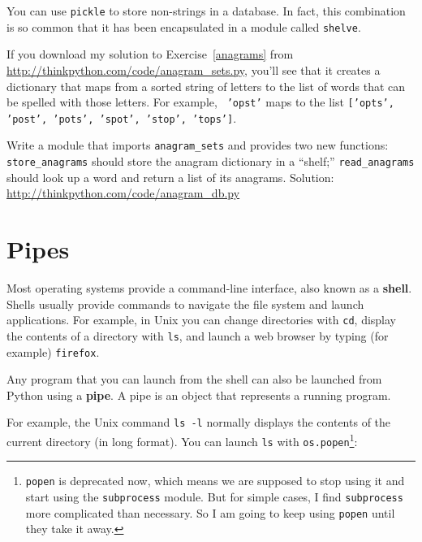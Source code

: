 \documentclass[10pt]{book}
\begin{document}
You can use {\tt pickle} to store non-strings in a database.
In fact, this combination is so common that it has been
encapsulated in a module called {\tt shelve}.  


\begin{exercise}

If you download my solution to Exercise~\ref{anagrams} from
\url{http://thinkpython.com/code/anagram_sets.py}, you'll see that it creates
a dictionary that maps from a sorted string of letters to the list of
words that can be spelled with those letters.  For example, {\tt
  'opst'} maps to the list {\tt ['opts', 'post', 'pots', 'spot',
    'stop', 'tops']}.

Write a module that imports \verb"anagram_sets" and provides
two new functions: \verb"store_anagrams" should store the
anagram dictionary in a ``shelf;'' \verb"read_anagrams" should
look up a word and return a list of its anagrams.
Solution: \url{http://thinkpython.com/code/anagram_db.py}

\end{exercise}


\section{Pipes}

Most operating systems provide a command-line interface,
also known as a {\bf shell}.  Shells usually provide commands
to navigate the file system and launch applications.  For
example, in Unix you can change directories with {\tt cd},
display the contents of a directory with {\tt ls}, and launch
a web browser by typing (for example) {\tt firefox}.

Any program that you can launch from the shell can also be
launched from Python using a {\bf pipe}.  A pipe is an object
that represents a running program.

For example, the Unix command {\tt ls -l} normally displays the
contents of the current directory (in long format).  You can
launch {\tt ls} with {\tt os.popen}\footnote{{\tt popen} is deprecated
now, which means we are supposed to stop using it and start using
the {\tt subprocess} module.  But for simple cases, I find
{\tt subprocess} more complicated than necessary.  So I am going
to keep using {\tt popen} until they take it away.}:
\end{document}
